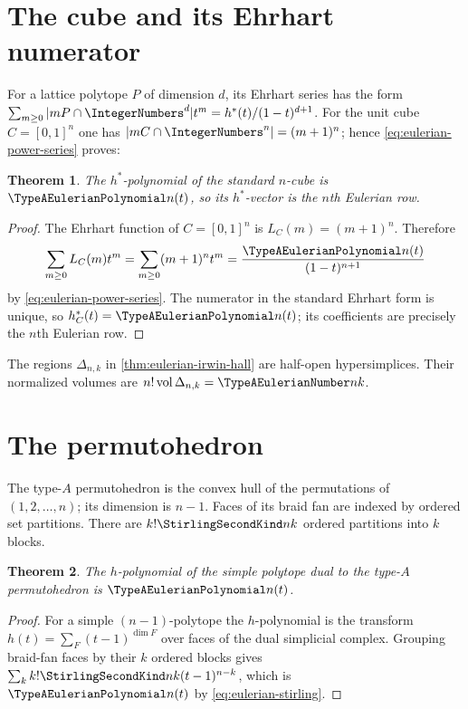 \documentclass[11pt,a4paper,oneside,openany]{book}
\newtheorem{theorem}{Theorem}[chapter]
\theoremstyle{definition}
\theoremstyle{remark}
\begin{document}
\section{The cube and its Ehrhart numerator}
For a lattice polytope $P$ of dimension $d$, its Ehrhart series has the form
$\sum_{m\ge0}|mP\cap\IntegerNumbers^d|t^m=h^*(t)/(1-t)^{d+1}$.
For the unit cube $C=[0,1]^n$ one has $|mC\cap\IntegerNumbers^n|=(m+1)^n$; hence
\eqref{eq:eulerian-power-series} proves:
\begin{theorem}
The $h^*$-polynomial of the standard $n$-cube is $\TypeAEulerianPolynomial n(t)$, so its $h^*$-vector is
the $n$th Eulerian row.
\end{theorem}
\begin{proof}
The Ehrhart function of $C=[0,1]^n$ is $L_C(m)=(m+1)^n$.  Therefore
\[
 \sum_{m\ge0}L_C(m)t^m=\sum_{m\ge0}(m+1)^nt^m
 =\frac{\TypeAEulerianPolynomial n(t)}{(1-t)^{n+1}}
\]
by \eqref{eq:eulerian-power-series}.  The numerator in the standard Ehrhart
form is unique, so $h_C^*(t)=\TypeAEulerianPolynomial n(t)$; its coefficients are precisely the
$n$th Eulerian row.
\end{proof}

The regions $\Delta_{n,k}$ in \cref{thm:eulerian-irwin-hall} are half-open
hypersimplices.  Their normalized volumes are $n!\operatorname{vol}\Delta_{n,k}
=\TypeAEulerianNumber nk$.

\section{The permutohedron}
The type-$A$ permutohedron is the convex hull of the permutations of
$(1,2,\ldots,n)$; its dimension is $n-1$.  Faces of its braid fan are indexed by
ordered set partitions.  There are $k!\StirlingSecondKind nk$ ordered partitions into $k$
blocks.

\begin{theorem}
The $h$-polynomial of the simple polytope dual to the type-$A$ permutohedron is
$\TypeAEulerianPolynomial n(t)$.
\end{theorem}
\begin{proof}
For a simple $(n-1)$-polytope the $h$-polynomial is the transform
$h(t)=\sum_F(t-1)^{\dim F}$ over faces of the dual simplicial complex.  Grouping
braid-fan faces by their $k$ ordered blocks gives
$\sum_k k!\StirlingSecondKind nk(t-1)^{n-k}$, which is $\TypeAEulerianPolynomial n(t)$ by
\eqref{eq:eulerian-stirling}.
\end{proof}
\end{document}
